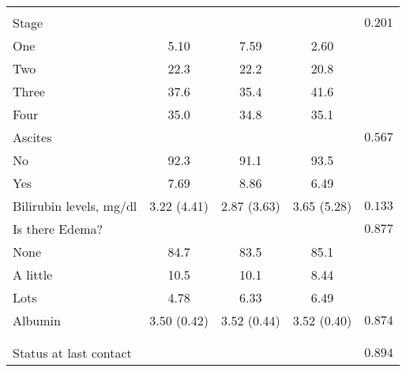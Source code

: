 \documentclass{article}\usepackage[]{graphicx}\usepackage[]{color}
\begin{document}
\begin{table}[H]
\begin{tabular}{>{\raggedright\arraybackslash}p{4cm}cccc}
\hline
\\[-0.5em]\hspace{1em}Stage &  &  &  & $ 0.201 $\\
\hspace{1em}\hspace{1em}One & 5.10 & 7.59 & 2.60 & $  $\\
\hspace{1em}\hspace{1em}Two & 22.3 & 22.2 & 20.8 & $  $\\
\hspace{1em}\hspace{1em}Three & 37.6 & 35.4 & 41.6 & $  $\\
\hspace{1em}\hspace{1em}Four & 35.0 & 34.8 & 35.1 & $  $\\
\hspace{1em}Ascites &  &  &  & $ 0.567 $\\
\hspace{1em}\hspace{1em}No & 92.3 & 91.1 & 93.5 & $  $\\
\hspace{1em}\hspace{1em}Yes & 7.69 & 8.86 & 6.49 & $  $\\
\hspace{1em}Bilirubin levels, mg/dl & 3.22 (4.41) & 2.87 (3.63) & 3.65 (5.28) & $ 0.133 $\\
\hspace{1em}Is there Edema? &  &  &  & $ 0.877 $\\
\hspace{1em}\hspace{1em}None & 84.7 & 83.5 & 85.1 & $  $\\
\hspace{1em}\hspace{1em}A little & 10.5 & 10.1 & 8.44 & $  $\\
\hspace{1em}\hspace{1em}Lots & 4.78 & 6.33 & 6.49 & $  $\\
\hspace{1em}Albumin & 3.50 (0.42) & 3.52 (0.44) & 3.52 (0.40) & $ 0.874 $\\
\addlinespace[0.5em]
\multicolumn{5}{l}{\textbf{Outcomes}}\\
\hline
\\[-0.5em]\hspace{1em}Status at last contact &  &  &  & $ 0.894 $\\

\end{tabular}
\end{table}
\end{document}
